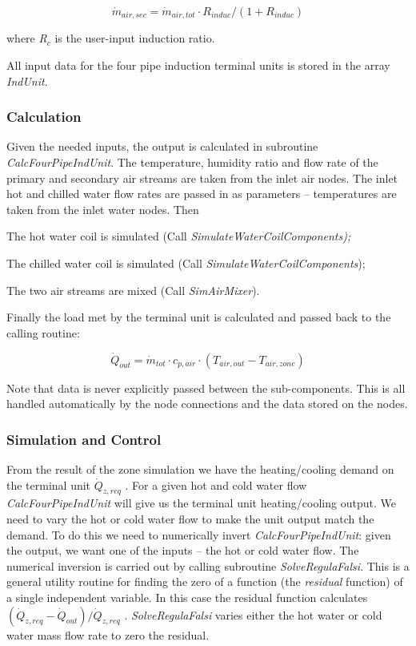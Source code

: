 \begin{equation}
{\dot m_{air,sec}} = {\dot m_{air,tot}}\cdot {R_{induc}}/(1 + {R_{induc}})
\end{equation}

where \emph{R\(_{c}\)} is the user-input induction ratio.

All input data for the four pipe induction terminal units is stored in the array \emph{IndUnit}.

\subsubsection{Calculation}\label{calculation}

Given the needed inputs, the output is calculated in subroutine \emph{CalcFourPipeIndUnit}. The temperature, humidity ratio and flow rate of the primary and secondary air streams are taken from the inlet air nodes. The inlet hot and chilled water flow rates are passed in as parameters -- temperatures are taken from the inlet water nodes. Then

The hot water coil is simulated (Call \emph{SimulateWaterCoilComponents);}

The chilled water coil is simulated (Call \emph{SimulateWaterCoilComponents});

The two air streams are mixed (Call \emph{SimAirMixer}).

Finally the load met by the terminal unit is calculated and passed back to the calling routine:

\begin{equation}
{\dot Q_{out}} = {\dot m_{tot}}\cdot {c_{p,air}}\cdot ({T_{air,out}} - {T_{air,zone}})
\end{equation}

Note that data is never explicitly passed between the sub-components. This is all handled automatically by the node connections and the data stored on the nodes.

\subsubsection{Simulation and Control}\label{simulation-and-control-1}

From the result of the zone simulation we have the heating/cooling demand on the terminal unit \({\dot Q_{z,req}}\) . For a given hot and cold water flow \emph{CalcFourPipeIndUnit} will give us the terminal unit heating/cooling output. We need to vary the hot or cold water flow to make the unit output match the demand. To do this we need to numerically invert \emph{CalcFourPipeIndUnit}: given the output, we want one of the inputs -- the hot or cold water flow. The numerical inversion is carried out by calling subroutine \emph{SolveRegulaFalsi}. This is a general utility routine for finding the zero of a function (the \emph{residual} function) of a single independent variable. In this case the residual function calculates \(({\dot Q_{z,req}} - {\dot Q_{out}})/{\dot Q_{z,req}}\) . \emph{SolveRegulaFalsi} varies either the hot water or cold water mass flow rate to zero the residual.

